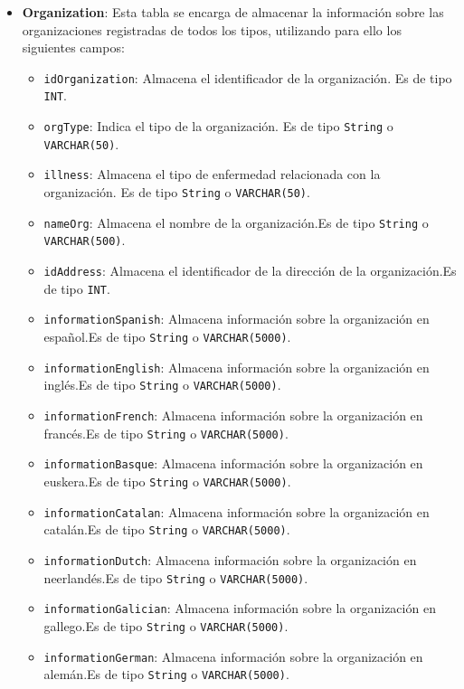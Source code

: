\begin{itemize}
    \item \textbf{Organization}: Esta tabla se encarga de almacenar la información sobre las organizaciones registradas de todos los tipos, utilizando para ello los siguientes campos:
        \begin{itemize}
        \item \texttt{idOrganization}: Almacena el identificador de la organización. Es de tipo \texttt{INT}.
        \item \texttt{orgType}: Indica el tipo de la organización. Es de tipo \texttt{String} o \texttt{VARCHAR(50)}.
        \item \texttt{illness}: Almacena el tipo de enfermedad relacionada con la organización. Es de tipo \texttt{String} o \texttt{VARCHAR(50)}.
        \item \texttt{nameOrg}: Almacena el nombre de la organización.Es de tipo \texttt{String} o \texttt{VARCHAR(500)}.
        \item \texttt{idAddress}: Almacena el identificador de la dirección de la organización.Es de tipo \texttt{INT}.
        \item \texttt{informationSpanish}: Almacena información sobre la organización en español.Es de tipo \texttt{String} o \texttt{VARCHAR(5000)}.
        \item \texttt{informationEnglish}: Almacena información sobre la organización en inglés.Es de tipo \texttt{String} o \texttt{VARCHAR(5000)}.
        \item \texttt{informationFrench}: Almacena información sobre la organización en francés.Es de tipo \texttt{String} o \texttt{VARCHAR(5000)}.
        \item \texttt{informationBasque}: Almacena información sobre la organización en euskera.Es de tipo \texttt{String} o \texttt{VARCHAR(5000)}.
        \item \texttt{informationCatalan}: Almacena información sobre la organización en catalán.Es de tipo \texttt{String} o \texttt{VARCHAR(5000)}.
        \item \texttt{informationDutch}: Almacena información sobre la organización en neerlandés.Es de tipo \texttt{String} o \texttt{VARCHAR(5000)}.
        \item \texttt{informationGalician}: Almacena información sobre la organización en gallego.Es de tipo \texttt{String} o \texttt{VARCHAR(5000)}.
        \item \texttt{informationGerman}: Almacena información sobre la organización en alemán.Es de tipo \texttt{String} o \texttt{VARCHAR(5000)}.

\end{itemize}
\end{itemize}
